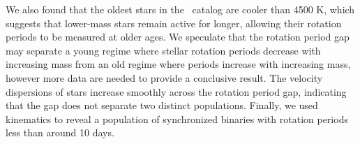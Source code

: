 We also found that the oldest stars in the \mct\ catalog are cooler than 4500
K, which suggests that lower-mass stars remain active for longer, allowing
their rotation periods to be measured at older ages.
We speculate that the rotation period gap \citep{mcquillan2014} may separate
a young regime where stellar rotation periods decrease with increasing mass
from an old regime where periods increase with increasing mass, however more
data are needed to provide a conclusive result.
The velocity dispersions of stars increase smoothly across the rotation period
gap, indicating that the gap does not separate two distinct populations.
Finally, we used kinematics to reveal a population of synchronized binaries
with rotation periods less than around 10 days.


